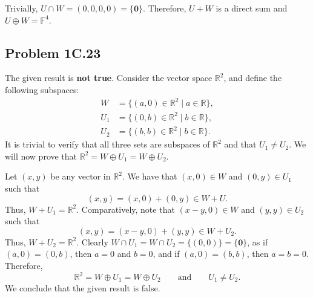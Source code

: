 \documentclass[11pt]{article}
\renewcommand{\vec}[1]{\mathbf{#1}}
\begin{document}
Trivially, $U \cap W = (0, 0, 0, 0) = \{ \vec{0} \}$. Therefore, $U + W$ is a direct sum and $U \oplus W = \mathbb{F}^{4}$.

\subsection{Problem 1C.23}

The given result is \textbf{not true}. Consider the vector space $\mathbb{R}^{2}$, and define the following subspaces: 
\begin{align*}
	W &= \{ (a, 0) \in \mathbb{R}^{2} \mid a \in \mathbb{R} \}, \\
	U_{1} &= \{ (0, b) \in \mathbb{R}^{2} \mid b \in \mathbb{R} \}, \\
	U_{2} &= \{ (b, b) \in \mathbb{R}^{2} \mid b \in \mathbb{R} \}.
\end{align*}
It is trivial to verify that all three sets are subspaces of $\mathbb{R}^{2}$ and that $U_{1} \ne U_{2}$. We will now prove that $\mathbb{R}^{2} = W \oplus U_{1} = W \oplus U_{2}$.

Let $(x, y)$ be any vector in $\mathbb{R}^{2}$. We have that $(x, 0) \in W$ and $(0, y) \in U_{1}$ such that
\[
	(x, y) = (x, 0) + (0, y) \in W + U.
\] 
Thus, $W + U_{1} = \mathbb{R}^{2}$. Comparatively, note that $(x - y, 0) \in W$ and $(y, y) \in U_{2}$ such that
\[
	(x , y) = (x - y, 0) + (y, y) \in W + U_{2}.
\]
Thus, $W + U_{2} = \mathbb{R}^{2}$. Clearly $W \cap U_{1} = W \cap U_{2} = \{ (0, 0) \} = \{ \vec{0} \}$, as if $(a, 0) = (0, b)$, then $a = 0$ and $b = 0$, and if $(a, 0) = (b, b)$, then $a = b = 0$. Therefore,
\[
	\mathbb{R}^{2} = W \oplus U_{1} = W \oplus U_{2} \qquad \text{and} \qquad  U_{1} \ne U_{2}.
\]
We conclude that the given result is false.

\end{document}
